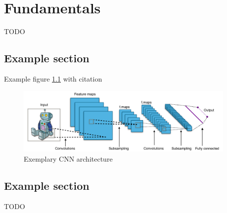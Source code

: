 \chapter{Fundamentals}
TODO

\section{Example section} 
Example figure \ref{img:cnn_example_network} with citation
\begin{figure}[H]
	\centering
	\includegraphics[width=0.95\textwidth]{resources/cnn/typical_cnn}
	\caption{Exemplary CNN architecture \cite{typical_cnn_img}}
	\label{img:cnn_example_network}
\end{figure}

\section{Example section}
TODO
